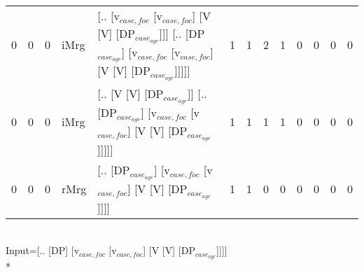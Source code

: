 \begin{tabularx}{\linewidth}{rrrlXrrrrrrrr}
   0 &       0 &   0 & iMrg & [.. [v$_{case,foc}$ [v$_{case,foc}$] [V [V] [DP$_{case_{agr}}$]]] [.. [DP$_{case_{agr}}$] [v$_{case,foc}$ [v$_{case,foc}$] [V [V] [DP$_{case_{agr}}$]]]]] &             1 &             1 &                  2 &            1 &              0 &                0 &              0 &          0 \\
   0 &       0 &   0 & iMrg & [.. [V [V] [DP$_{case_{agr}}$]] [.. [DP$_{case_{agr}}$] [v$_{case,foc}$ [v$_{case,foc}$] [V [V] [DP$_{case_{agr}}$]]]]]                           &             1 &             1 &                  1 &            1 &              0 &                0 &              0 &          0 \\
   0 &       0 &   0 & rMrg & [.. [DP$_{case_{agr}}$] [v$_{case,foc}$ [v$_{case,foc}$] [V [V] [DP$_{case_{agr}}$]]]]                                                      &             1 &             1 &                  0 &            0 &              0 &                0 &              0 &          0 \\
\hline
\end{tabularx}\endgroup\\
\begingroup\scriptsize Input=[.. [DP] [v$_{case,foc}$ [v$_{case,foc}$] [V [V] [DP$_{case_{agr}}$]]]]\\*
